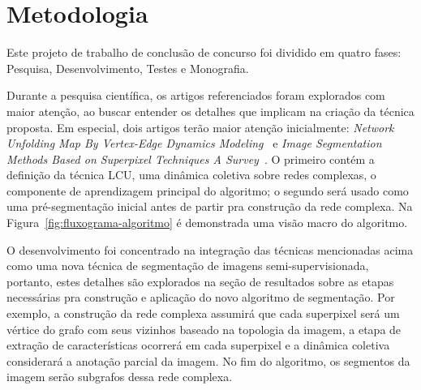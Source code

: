 \chapter{Metodologia}\label{cap:metodologia}


Este projeto de trabalho de conclusão de concurso foi dividido em quatro fases:
Pesquisa, Desenvolvimento, Testes e Monografia.

Durante a pesquisa científica, os artigos referenciados foram explorados com
maior atenção, ao buscar entender os detalhes que implicam
na criação da técnica proposta. Em especial, dois artigos terão maior
atenção inicialmente: \textit{Network Unfolding Map By Vertex-Edge
  Dynamics Modeling}~\cite{VerriNetworkUnfoldingMap2018} e
\textit{Image Segmentation Methods Based on Superpixel Techniques A
  Survey}~\cite{SuperpixelSurvey2020}. O primeiro contém a definição
da técnica LCU, uma dinâmica coletiva sobre redes complexas, o
componente de aprendizagem principal do algoritmo; o segundo será
usado como uma pré-segmentação inicial antes de partir pra construção
da rede complexa. Na Figura~\ref{fig:fluxograma-algoritmo} é demonstrada uma
visão macro do algoritmo.

\begin{figure}[!h]
        \captionsetup{width=8cm}
		\centering
\end{figure}


O desenvolvimento foi concentrado na integração das técnicas
mencionadas acima como uma nova técnica de segmentação de imagens
semi-supervisionada, portanto, estes detalhes são explorados na seção
de resultados sobre as etapas necessárias pra construção e aplicação
do novo algoritmo de segmentação. Por exemplo, a construção da rede
complexa assumirá que cada superpixel será um vértice do grafo com
seus vizinhos baseado na topologia da imagem, a etapa de extração de
características ocorrerá em cada superpixel e a dinâmica coletiva
considerará a anotação parcial da imagem. No fim do algoritmo, os
segmentos da imagem serão subgrafos dessa rede complexa.

